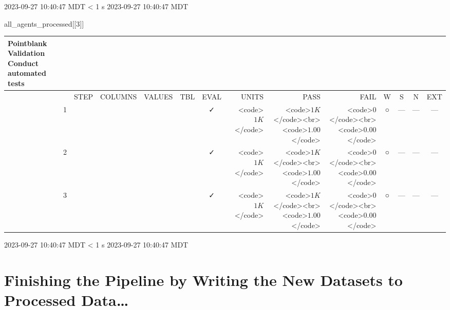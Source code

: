 \documentclass[
  letterpaper,
  DIV=11,
  numbers=noendperiod]{scrreprt}
\newenvironment{Shaded}{\begin{snugshade}}{\end{snugshade}}
\newcommand{\DecValTok}[1]{\textcolor[rgb]{0.68,0.00,0.00}{#1}}
\newcommand{\NormalTok}[1]{\textcolor[rgb]{0.00,0.23,0.31}{#1}}
\begin{document}
\begin{minipage}{\linewidth}
2023-09-27 10:40:47 MDT
\textless{} 1 s
2023-09-27 10:40:47 MDT\\
\end{minipage}

\begin{Shaded}
\begin{Highlighting}[]
\NormalTok{all\_agents\_processed[[}\DecValTok{3}\NormalTok{]]}
\end{Highlighting}
\end{Shaded}

\setlength{\LTpost}{0mm}
\begin{longtable}{lrlllccrrrcccc}
\caption*{
{\large Pointblank Validation} \\ 
{\small Conduct automated tests}
} \\ 
\toprule
 &  & STEP & COLUMNS & VALUES & TBL & EVAL & UNITS & PASS & FAIL & W & S & N & EXT \\ 
\midrule
 & 1 &  &  &  &                                                              & ✓ & <code>$1K$</code> & <code>$1K$</code><br><code>$1.00$</code> & <code>$0$</code><br><code>$0.00$</code> & ○ & --- & --- & --- \\ 
 & 2 &  &  &  &                                                              & ✓ & <code>$1K$</code> & <code>$1K$</code><br><code>$1.00$</code> & <code>$0$</code><br><code>$0.00$</code> & ○ & --- & --- & --- \\ 
 & 3 &  &  &  &                                                              & ✓ & <code>$1K$</code> & <code>$1K$</code><br><code>$1.00$</code> & <code>$0$</code><br><code>$0.00$</code> & ○ & --- & --- & --- \\ 
\bottomrule
\end{longtable}
\begin{minipage}{\linewidth}
2023-09-27 10:40:47 MDT
\textless{} 1 s
2023-09-27 10:40:47 MDT\\
\end{minipage}

\hypertarget{finishing-the-pipeline-by-writing-the-new-datasets-to-processed-data}{%
\section{Finishing the Pipeline by Writing the New Datasets to Processed
Data\ldots{}}\label{finishing-the-pipeline-by-writing-the-new-datasets-to-processed-data}}
\end{document}
